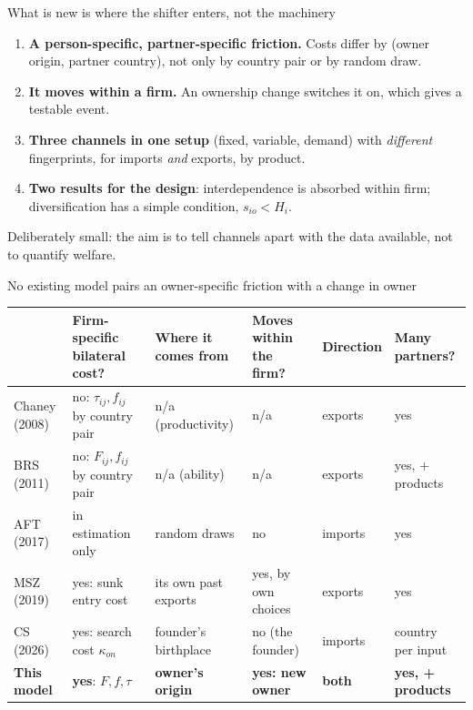 \documentclass[11pt,aspectratio=169,notes]{beamer}
\begin{document}
\begin{frame}{What is new is where the shifter enters, not the machinery}
\vspace{0.3cm}
\small
\begin{enumerate}\setlength{\itemsep}{4pt}
\item \textbf{A person-specific, partner-specific friction.} Costs differ by (owner origin, partner country), not only by country pair or by random draw.
\item \textbf{It moves within a firm.} An ownership change switches it on, which gives a testable event.
\item \textbf{Three channels in one setup} (fixed, variable, demand) with \emph{different} fingerprints, for imports \emph{and} exports, by product.
\item \textbf{Two results for the design}: interdependence is absorbed within firm; diversification has a simple condition, $s_{io}<H_i$.
\end{enumerate}
\vspace{0.05cm}
\begin{keybox}
Deliberately small: the aim is to tell channels apart with the data available, not to quantify welfare.
\end{keybox}
\end{frame}

\begin{frame}{No existing model pairs an owner-specific friction with a change in owner}
\vspace{-0.15cm}
\scriptsize
\renewcommand{\arraystretch}{1.08}
\begin{tabularx}{\textwidth}{@{}>{\raggedright\arraybackslash}p{2.0cm}>{\raggedright\arraybackslash}p{3.0cm}YYp{1.2cm}>{\raggedright\arraybackslash}p{1.7cm}@{}}
\toprule
 & \textbf{Firm-specific bilateral cost?} & \textbf{Where it comes from} & \textbf{Moves within the firm?} & \textbf{Direction} & \textbf{Many partners?}\\
\midrule
Chaney (2008) & no: $\tau_{ij},f_{ij}$ by country pair & n/a (productivity) & n/a & exports & yes\\
BRS (2011) & no: $F_{ij},f_{ij}$ by country pair & n/a (ability) & n/a & exports & yes, + products\\
AFT (2017) & in estimation only & random draws & no & imports & yes\\
MSZ (2019) & yes: sunk entry cost & its own past exports & yes, by own choices & exports & yes\\
CS (2026) & yes: search cost $\kappa_{on}$ & founder's birthplace & no (the founder) & imports & 1 country per input\\
\midrule
\textbf{This model} & \textbf{yes}: $F,f,\tau$ & \textbf{owner's origin} & \textbf{yes: new owner} & \textbf{both} & \textbf{yes, + products}\\
\bottomrule
\end{tabularx}
\end{frame}
\end{document}
